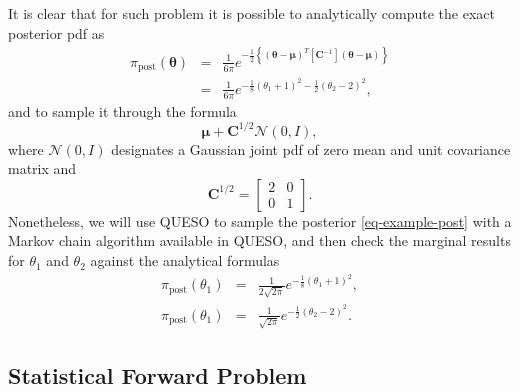 It is clear that for such problem it is possible to analytically compute the exact posterior pdf as
\begin{eqnarray*}
\pi_{\text{post}}(\boldsymbol{\theta}) & = & \frac{1}{6\pi} e^{-\frac{1}{2}\left\{(\boldsymbol{\theta}-\boldsymbol{\mu})^T[\mathbf{C}^{-1}](\boldsymbol{\theta}-\boldsymbol{\mu})\right\}} \\
                                       & = & \frac{1}{6\pi} e^{-\frac{1}{8}(\theta_1+1)^2 - \frac{1}{2}(\theta_2-2)^2}, \label{eq-example-exact-joint}
\end{eqnarray*}
and to sample it through the formula
\begin{equation*}
\boldsymbol{\mu}+\mathbf{C}^{1/2}\mathcal{N}(0,I),
\end{equation*}
where $\mathcal{N}(0,I)$ designates a Gaussian joint pdf of zero mean and unit covariance matrix
and
\begin{equation*}
\mathbf{C}^{1/2} = 
\left[
\begin{array}{cc}
2 & 0 \\
0 & 1
\end{array}
\right].
\end{equation*}
Nonetheless, we will use QUESO to sample the posterior \eqref{eq-example-post}
with a Markov chain algorithm available in QUESO, and
then check the marginal results for $\theta_1$ and $\theta_2$ against the analytical formulas
\begin{eqnarray*}
\pi_{\text{post}}(\theta_1) & = & \frac{1}{2\sqrt{2\pi}} e^{-\frac{1}{8}(\theta_1+1)^2}, \label{eq-example-exact-marg-1}\\
\pi_{\text{post}}(\theta_1) & = & \frac{1}{ \sqrt{2\pi}} e^{-\frac{1}{2}(\theta_2-2)^2}. \label{eq-example-exact-marg-2}
\end{eqnarray*}

\subsection{Statistical Forward Problem}

